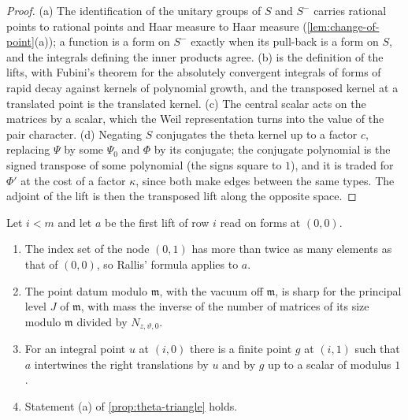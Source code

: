 \begin{proof}
(a) The identification of the unitary groups of $S$ and $S^-$ carries rational points to rational points and Haar measure to Haar measure (\cref{lem:change-of-point}(a)); a function is a form on $S^-$ exactly when its
pull-back is a form on $S$, and the integrals defining the inner products agree. (b) is the definition of the lifts, with Fubini's theorem for the absolutely convergent integrals of forms of rapid decay
against kernels of polynomial growth, and the transposed kernel at a translated point is the translated kernel. (c) The central scalar acts on the matrices by a scalar, which the Weil representation turns into
the value of the pair character. (d) Negating $S$ conjugates the theta kernel up to a factor $c$, replacing $\Psi$ by some $\Psi_0$ and $\Phi$ by its conjugate; the conjugate polynomial is the signed transpose of
some polynomial (the signs square to $1$), and it is traded for $\Phi'$ at the cost of a factor $\kappa$, since both make edges between the same types. The adjoint of the lift is then the transposed lift
along the opposite space.
\end{proof}

\begin{lemma}\label{lem:first-lift}
Let $i<m$ and let $a$ be the first lift of row $i$ read on forms at $(0,0)$.
\begin{enumerate}[label=\textup{(\alph*)}]
\item The index set of the node $(0,1)$ has more than twice as many elements as that of $(0,0)$, so Rallis' formula applies to $a$.
\item The point datum modulo $\mathfrak m$, with the vacuum off $\mathfrak m$, is sharp for the principal level $J$ of $\mathfrak m$, with mass the inverse of the number of matrices of its size modulo $\mathfrak m$ divided by
$N_{z,\vartheta,0}$.
\item For an integral point $u$ at $(i,0)$ there is a finite point $g$ at $(i,1)$ such that $a$ intertwines the right translations by $u$ and by $g$ up to a scalar of modulus $1$.
\item Statement (a) of \cref{prop:theta-triangle} holds.
\end{enumerate}
\end{lemma}

